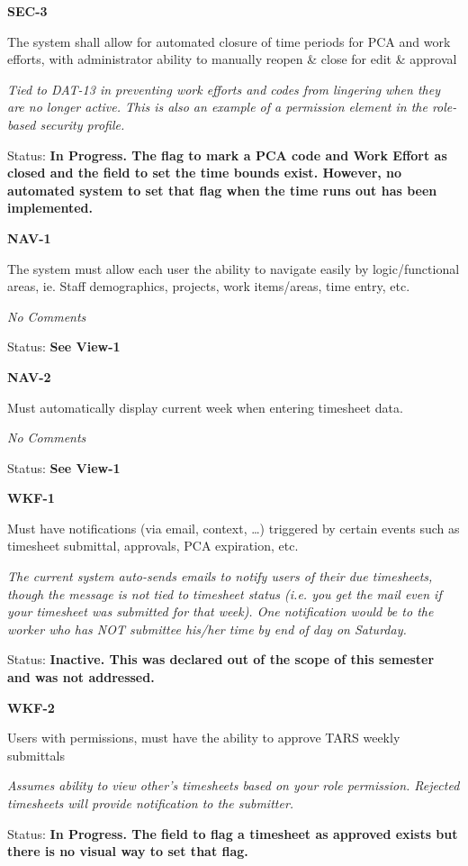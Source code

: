\noindent 

\noindent \textbf{SEC-3}

\noindent The system shall allow for automated closure of time periods for PCA and work efforts, with administrator ability to manually reopen \& close for edit \& approval

\noindent \textit{Tied to DAT-13 in preventing work efforts and codes from lingering when they are no longer active. This is also an example of a permission element in the role-based security profile.}

\noindent Status: \textbf{In Progress.  The flag to mark a PCA code and Work Effort as closed and the field to set the time bounds exist.  However, no automated system to set that flag when the time runs out has been implemented.}\\

\noindent 

\noindent \textbf{NAV-1}

\noindent The system must allow each user the ability to navigate easily by logic/functional areas, ie. Staff demographics, projects, work items/areas, time entry, etc.

 \textit{No Comments}

Status: \textbf{See View-1}\textit{}\\

\noindent 

\noindent \textbf{NAV-2}

\noindent Must automatically display current week when entering timesheet data.

 \textit{No Comments }

\textit{ }Status: \textbf{See View-1}\textit{}\\

\noindent 

\noindent \textbf{WKF-1}

\noindent Must have notifications (via email, context, \dots ) triggered by certain events such as timesheet submittal, approvals, PCA expiration, etc.

\noindent \textit{The current system auto-sends emails to notify users of their due timesheets, though the message is not tied to timesheet status (i.e. you get the mail even if your timesheet was submitted for that week). One notification would be to the worker who has NOT submittee his/her time by end of day on Saturday.}

\noindent Status: \textbf{Inactive.  This was declared out of the scope of this semester and was not addressed.}\\

\noindent 

\noindent \textbf{WKF-2}

\noindent Users with permissions, must have the ability to approve TARS weekly submittals

\noindent \textit{Assumes ability to view other's timesheets based on your role permission. Rejected timesheets will provide notification to the submitter.}

\noindent Status: \textbf{In Progress.  The field to flag a timesheet as approved exists but there is no visual way to set that flag.}
